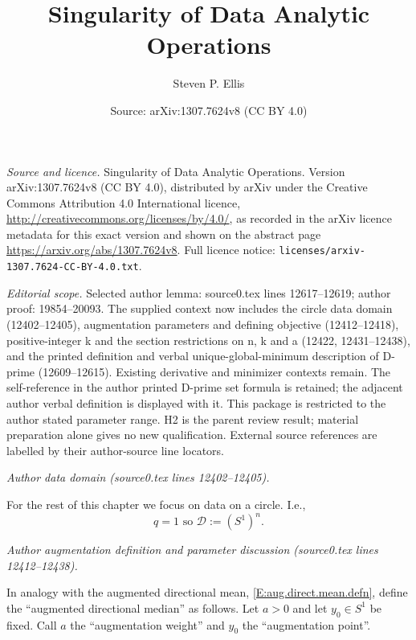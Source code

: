 \documentclass[10pt,a4paper]{amsart}
\title{Singularity of Data Analytic Operations}
\author{Steven P. Ellis}
\date{Source: arXiv:1307.7624v8 (CC BY 4.0)}
\newcommand{\D}{\mathcal{D}}
\newcommand{\nvar}{q}
\begin{document}
\maketitle

\noindent\emph{Source and licence.} Singularity of Data Analytic Operations. Version arXiv:1307.7624v8 (CC BY 4.0), distributed by arXiv under the Creative Commons Attribution 4.0 International licence, \url{http://creativecommons.org/licenses/by/4.0/}, as recorded in the arXiv licence metadata for this exact version and shown on the abstract page \url{https://arxiv.org/abs/1307.7624v8}. Full licence notice: \texttt{licenses/arxiv-1307.7624-CC-BY-4.0.txt}.\par\smallskip

\noindent\textit{Editorial scope.} Selected author lemma: source0.tex lines 12617--12619; author proof: 19854--20093. The supplied context now includes the circle data domain (12402--12405), augmentation parameters and defining objective (12412--12418), positive-integer k and the section restrictions on n, k and a (12422, 12431--12438), and the printed definition and verbal unique-global-minimum description of D-prime (12609--12615). Existing derivative and minimizer contexts remain. The self-reference in the author printed D-prime set formula is retained; the adjacent author verbal definition is displayed with it. This package is restricted to the author stated parameter range. H2 is the parent review result; material preparation alone gives no new qualification. External source references are labelled by their author-source line locators.\par\smallskip
\par\medskip\noindent\textit{Author data domain (source0.tex lines 12402--12405).}\par\smallskip
For the rest of this chapter we focus on data on a circle. I.e., 
    \begin{equation}  \label{E:ma:nvar=1}
      \nvar=1 \text{ so } \D := (S^{1})^{n} .
    \end{equation}
\par\medskip\noindent\textit{Author augmentation definition and parameter discussion (source0.tex lines 12412--12438).}\par\smallskip
In analogy with the augmented directional mean, \eqref{E:aug.direct.mean.defn}, define the ``augmented directional median'' as follows.  Let $a > 0$ and let $y_{0} \in S^{1}$ be fixed. Call $a$ the ``augmentation weight'' and $y_{0}$ the ``augmentation point''. 
\end{document}
